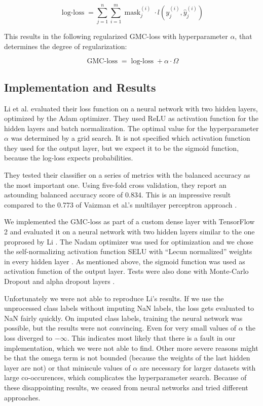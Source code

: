 \begin{equation}
	\operatorname{log-loss} = \sum_{j=1}^{n}\sum_{i=1}^{m} \operatorname{mask}_j^{(i)} \cdot l(y_j^{(i)}, \hat{y}_j^{(i)})
\end{equation}

This results in the following regularized GMC-loss with hyperparameter $\alpha$, that determines the degree of regularization:

\begin{equation}
	\operatorname{GMC-loss} = \operatorname{log-loss} + \alpha \cdot \Omega
\end{equation}

\subsection{Implementation and Results}

Li et al. evaluated their loss function on a neural network with two hidden layers, optimized by the Adam optimizer. They used ReLU as activation function for the hidden layers and batch normalization. The optimal value for the hyperparameter $\alpha$ was determined by a grid search. It is not specified which activation function they used for the output layer, but we expect it to be the sigmoid function, because the log-loss expects probabilities.

They tested their classifier on a series of metrics with the balanced accuracy as the most important one. Using five-fold cross validation, they report an astounding balanced accuracy score of 0.834. This is an impressive result compared to the 0.773 of Vaizman et al.'s multilayer perceptron approach \cite{Vaizman18}.

We implemented the GMC-loss as part of a custom dense layer with TensorFlow 2 and evaluated it on a neural network with two hidden layers similar to the one proprosed by Li \cite{tensorflow2015}. The Nadam optimizer was used for optimization \cite{Dozat2015} and we chose the self-normalizing activation function SELU with \enquote{Lecun normalized} weights in every hidden layer \cite{Klambauer17}. As mentioned above, the sigmoid function was used as activation function of the output layer. Tests were also done with Monte-Carlo Dropout and alpha dropout layers \cite{Gal2016}.

Unfortunately we were not able to reproduce Li's results. If we use the unprocessed class labels without imputing NaN labels, the loss gets evaluated to NaN fairly quickly. On imputed class labels, training the neural network was possible, but the results were not convincing. Even for very small values of $\alpha$ the loss diverged to $-\infty$. This indicates most likely that there is a fault in our implementation, which we were not able to find. Other more severe reasons might be that the omega term is not bounded (because the weights of the last hidden layer are not) or that miniscule values of $\alpha$ are necessary for larger datasets with large co-occurences, which complicates the hyperparameter search.
Because of these disappointing results, we ceased from neural networks and tried different approaches. 